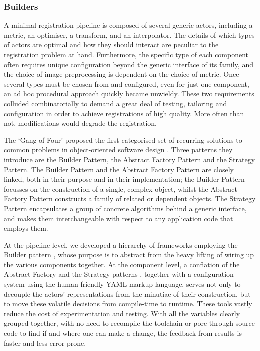     \subsubsection{Builders} %
    \label{ssub:builders}
      A minimal registration pipeline is composed of several generic actors, including a metric, an optimiser, a transform, and an interpolator. The details of which types of actors are optimal and how they should interact are peculiar to the registration problem at hand. Furthermore, the specific type of each component often requires unique configuration beyond the generic interface of its family, and the choice of image preprocessing is dependent on the choice of metric. Once several types must be chosen from and configured, even for just one component, an ad hoc procedural approach quickly became unwieldy. These two requirements colluded combinatorially to demand a great deal of testing, tailoring and configuration in order to achieve registrations of high quality. More often than not, modifications would degrade the registration.
			
      The `Gang of Four' proposed the first categorised set of recurring solutions to common problems in object-oriented software design \cite{Gamma1995}. Three patterns they introduce are the Builder Pattern, the Abstract Factory Pattern and the Strategy Pattern. The Builder Pattern and the Abstract Factory Pattern are closely linked, both in their purpose and in their implementation; the Builder Pattern focusses on the construction of a single, complex object, whilst the Abstract Factory Pattern constructs a family of related or dependent objects. The Strategy Pattern encapsulates a group of concrete algorithms behind a generic interface, and makes them interchangeable with respect to any application code that employs them.
      
      At the pipeline level, we developed a hierarchy of frameworks employing the Builder pattern \cite{Gamma1995}, whose purpose is to abstract from the heavy lifting of wiring up the various components together. At the component level, a conflation of the Abstract Factory and the Strategy patterns \cite{Gamma1995}, together with a configuration system using the human-friendly YAML markup language, serves not only to decouple the actors' representations from the minutiae of their construction, but to move these volatile decisions from compile-time to runtime. These tools vastly reduce the cost of experimentation and testing. With all the variables clearly grouped together, with no need to recompile the toolchain or pore through source code to find if and where one can make a change, the feedback from results is faster and less error prone.
      
